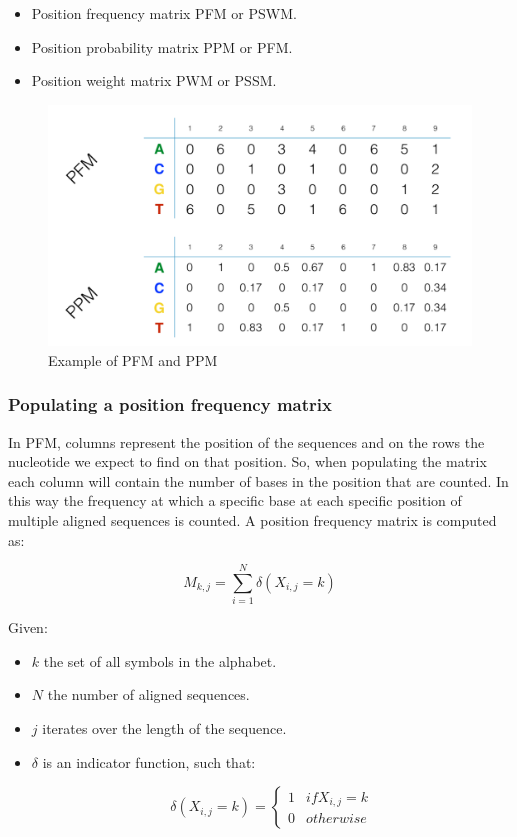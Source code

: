 	\begin{multicols}{2}
		\begin{itemize}
			\item Position frequency matrix PFM or PSWM.
			\item Position probability matrix PPM or PFM.
			\item Position weight matrix PWM or PSSM.
		\end{itemize}
	\end{multicols}

	\begin{figure}[H]
		\centering
		\includegraphics[scale=0.3]{matrices.png}
		\caption{Example of PFM and PPM}
		\label{fig:matrices}
	\end{figure}

		\subsubsection{Populating a position frequency matrix}
		In PFM, columns represent the position of the sequences and on the rows the nucleotide we expect to find on that position.
		So, when populating the matrix each column will contain the number of bases in the position that are counted.
		In this way the frequency at which a specific base at each specific position of multiple aligned sequences is counted.
		A position frequency matrix is computed as:

		$$M_{k,j} = \sum\limits_{i=1}^N\delta(X_{i,j} = k)$$

		Given:

		\begin{multicols}{2}
			\begin{itemize}
				\item $k$ the set of all symbols in the alphabet.
				\item $N$ the number of aligned sequences.
				\item $j$ iterates over the length of the sequence.
				\item $\delta$ is an indicator function, such that:

					$$\delta(X_{i,j} = k) = \begin{cases}1 &if X_{i,j} = k \\0 & otherwise\end{cases}$$

			\end{itemize}
		\end{multicols}


